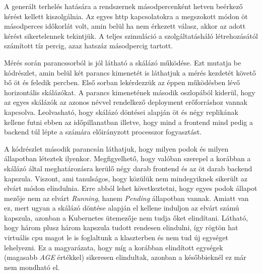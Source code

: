 A generált terhelés hatására a rendszernek másodpercenként hetven beérkező kérést kellett kiszolgálnia. 
Az egyes http kapcsolatokra a megszokott módon öt másodperces időkorlát volt, amin belül ha nem érkezett válasz, akkor az adott kérést sikertelennek tekintjük.
A teljes szimuláció a szolgáltatásháló létrehozásától számított tíz percig, azaz hatszáz másodpercig tartott.

Mérés során parancssorból is jól látható a skálázó működése. 
Ezt mutatja be  kódrészlet, amin belül két parancs kimenetét is láthatjuk a mérés kezdetét követő bő öt és feledik percben.
Első sorban lekérdezzük az éppen működésben lévő horizontális skálázókat. 
A parancs kimenetének második oszlopából kiderül, hogy az egyes skálázók az azonos névvel rendelkező deployment erőforráshoz vannak kapcsolva.
Leolvasható, hogy skálázó döntései alapján öt és négy replikának kellene futni ebben az időpillanatban illetve, hogy mind a frontend mind pedig a backend túl lépte a számára előirányzott processzor fogyasztást.

A kódrészlet második parancsán láthatjuk, hogy milyen podok és milyen állapotban léteztek ilyenkor.
Megfigyelhető, hogy valóban szerepel a korábban a skálázó által meghatározásra kerülő négy darab frontend és az öt darab backend kapszula.
Viszont, ami tanulságos, hogy közülük nem mindegyiknek sikerült az elvárt módon elindulnia.
Erre abból lehet következtetni, hogy egyes podok állapot mezője nem az elvárt \textit{Running}, hanem \textit{Pending} állapotban vannak.
Amiatt van ez, mert ugyan a skálázó döntése alapján el kellene induljon az elvárt számú kapszula, azonban a Kubernetes ütemezője nem tudja őket elindítani.
Látható, hogy három plusz három kapszula tudott rendesen elindulni, így rögtön hat virtuális cpu magot le is foglaltunk a klaszterben és nem tud új egységet lehelyezni.
Ez a magyarázata, hogy míg a korábban elindított egységek (magasabb \textit{AGE} értékkel) sikeresen elindultak, azonban a későbbieknél ez már nem mondható el.

\lstset{caption=Horizontális skálázóval történő mérés, label=hpa_measurement_pending}


